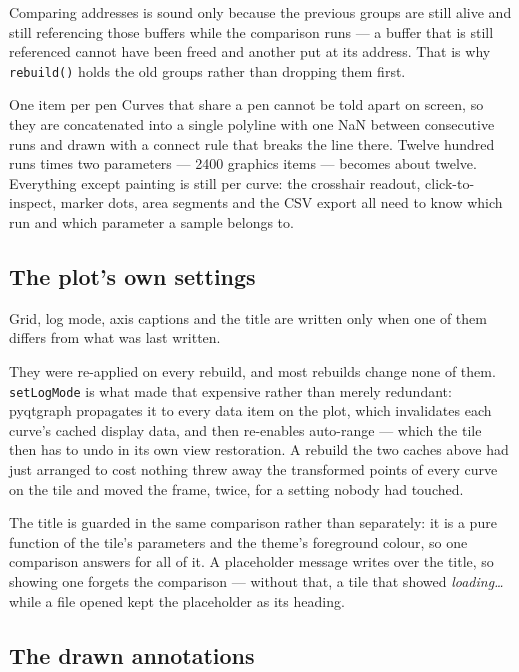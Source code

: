 \documentclass[11pt,a4paper,oneside]{report}
\newcommand{\code}[1]{\texttt{#1}}
\begin{document}
Comparing addresses is sound only because the previous groups are still alive
and still referencing those buffers while the comparison runs --- a buffer that
is still referenced cannot have been freed and another put at its address. That
is why \code{rebuild()} holds the old groups rather than dropping them first.

\begin{aoenote}{One item per pen}
Curves that share a pen cannot be told apart on screen, so they are concatenated
into a single polyline with one NaN between consecutive runs and drawn with a
connect rule that breaks the line there. Twelve hundred runs times two
parameters --- 2400 graphics items --- becomes about twelve. Everything except
painting is still per curve: the crosshair readout, click-to-inspect, marker
dots, area segments and the CSV export all need to know which run and which
parameter a sample belongs to.
\end{aoenote}

\subsection{The plot's own settings}

Grid, log mode, axis captions and the title are written only when one of them
differs from what was last written.

They were re-applied on every rebuild, and most rebuilds change none of them.
\code{setLogMode} is what made that expensive rather than merely redundant:
pyqtgraph propagates it to every data item on the plot, which invalidates each
curve's cached display data, and then re-enables auto-range --- which the tile
then has to undo in its own view restoration. A rebuild the two caches above had
just arranged to cost nothing threw away the transformed points of every curve
on the tile and moved the frame, twice, for a setting nobody had touched.

The title is guarded in the same comparison rather than separately: it is a pure
function of the tile's parameters and the theme's foreground colour, so one
comparison answers for all of it. A placeholder message writes over the title,
so showing one forgets the comparison --- without that, a tile that showed
\emph{loading\ldots} while a file opened kept the placeholder as its heading.

\subsection{The drawn annotations}
\end{document}
